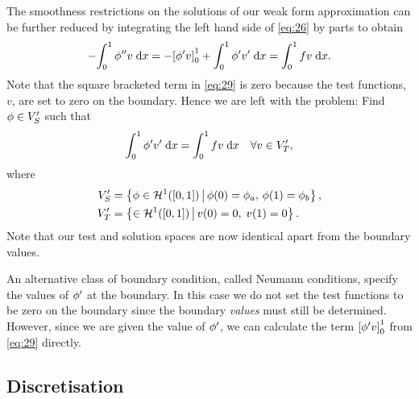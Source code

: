 The smoothness restrictions on the solutions of our weak form approximation can be further reduced by integrating the left hand side of \cref{eq:26} by parts to obtain
\begin{equation}
  -{\int_0^1  \phi''v  {\; \mathrm{{d}}}{x}} = -{\left[ \phi' v \right]}_{0}^{1} + {\int_0^1  \phi'v'  {\; \mathrm{{d}}}{x}} = {\int_0^1 f v {\; \mathrm{{d}}}{x}}.
  \label{eq:29}
\end{equation}
Note that the square bracketed term in \cref{eq:29} is zero because the test functions, $v$, are set to zero on the boundary.
Hence we are left with the problem: Find $\phi \in V_S'$ such that
\begin{equation}
  {\int_0^1  \phi'v'  {\; \mathrm{{d}}}{x}} = {\int_0^1  fv  {\; \mathrm{{d}}}{x}} \quad \forall v \in V'_T,
  \label{eq:symmetric-weak-poisson}
\end{equation}
where
\begin{equation}
  \begin{aligned}
    V'_S &= \left\{ {\phi \in \mathcal{H}^1([0,1]) } \,\middle|\, {  \phi(0) = \phi_{a},\, \phi(1) = \phi_{b}} \right\}, \\
     V'_T &= \left\{ { \in \mathcal{H}^1([0,1]) } \,\middle|\, {  v(0) =0,\; v(1)=0  } \right\}.
  \end{aligned}
\end{equation}
Note that our test and solution spaces are now identical apart from the boundary values.

An alternative class of boundary condition, called Neumann conditions, specify the values of $\phi'$ at the boundary.
In this case we do not set the test functions to be zero on the boundary since the boundary \emph{values} must still be determined.
However, since we are given the value of $\phi'$, we can calculate the term ${\left[ \phi' v \right]}_{0}^{1}$ from \cref{eq:29} directly.

\subsection{Discretisation}

